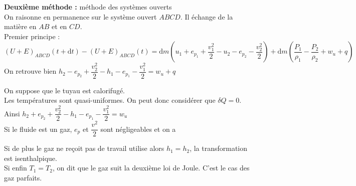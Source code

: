 ﻿\documentclass[a4paper]{article}
\begin{document}
  \textbf{Deuxième méthode :} méthode des systèmes ouverts\\
  On raisonne en permanence sur le système ouvert $ABCD$. Il échange de la matière en $AB$ et en $CD$.\\
  Premier principe :\\ $(U+E)_{ABCD}(t+\mathrm{d}t)-(U+E)_{ABCD}(t)=\mathrm{d}m\left(u_1+e_{p_1}+\dfrac{v_1^2}{2}-u_2-e_{p_2}-\dfrac{v_2^2}{2}\right)+\mathrm{d}m\left( \dfrac{P_1}{\rho_1}-\dfrac{P_2}{\rho_2}+w_u+q \right)$\\
  On retrouve bien $h_2-e_{p_2}+\dfrac{v_2^2}{2}-h_1-e_{p_1}-\dfrac{v_1^2}{2}=w_u+q$

  On suppose que le tuyau est calorifugé.\\
  Les températures sont quasi-uniformes. On peut donc considérer que $\delta Q=0$. \\Ainsi $h_2+e_{p_2}+\dfrac{v_2^2}{2}-h_1-e_{p_1}-\dfrac{v_1^2}{2}=w_u$\\
  Si le fluide est un gaz, $e_p$ et $\dfrac{v^2}{2}$ sont négligeables et on a \par
  Si de plus le gaz ne reçoit pas de travail utilise alors $h_1=h_2$, la transformation est isenthalpique.\\
  Si enfin $T_1=T_2$, on dit que le gaz suit la deuxième loi de Joule. C'est le cas des gaz parfaits.
\end{document}
